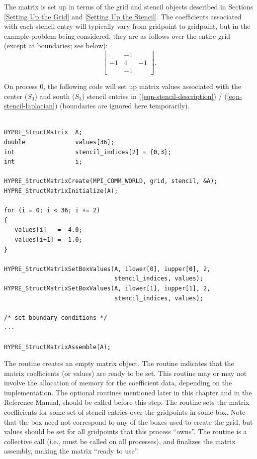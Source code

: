 The matrix is set up in terms of the grid and stencil objects
described in Sections
\ref{Setting Up the Grid} and \ref{Setting Up the Stencil}.
The coefficients associated with each stencil entry will typically
vary from gridpoint to gridpoint, but in the example problem being
considered, they are as follows over the entire grid (except at
boundaries; see below):
\begin{equation}\label{eqn-stencil-laplacian}
\left [
\begin{array}{ccc}
    & -1 &    \\
 -1 &  4 & -1 \\
    & -1 &    
\end{array}
\right ] .
\end{equation}

On process 0, the following code will set up matrix values associated
with the center ($S_0$) and south ($S_3$) stencil entries in
(\ref{eqn-stencil-description}) / (\ref{eqn-stencil-laplacian})
(boundaries are ignored here temporarily).
\begin{display}
\begin{verbatim}

HYPRE_StructMatrix  A;
double              values[36];
int                 stencil_indices[2] = {0,3};
int                 i;

HYPRE_StructMatrixCreate(MPI_COMM_WORLD, grid, stencil, &A);
HYPRE_StructMatrixInitialize(A);

for (i = 0; i < 36; i += 2)
{
   values[i]   =  4.0;
   values[i+1] = -1.0;
}

HYPRE_StructMatrixSetBoxValues(A, ilower[0], iupper[0], 2,
                               stencil_indices, values);
HYPRE_StructMatrixSetBoxValues(A, ilower[1], iupper[1], 2,
                               stencil_indices, values);

/* set boundary conditions */
...

HYPRE_StructMatrixAssemble(A);

\end{verbatim}
\end{display}
The  routine creates an empty matrix object.  The
 routine indicates that the matrix coefficients
(or values) are ready to be set.  This routine may or may not involve
the allocation of memory for the coefficient data, depending on the
implementation.  The optional  routines mentioned later in
this chapter and in the Reference Manual, should be called before this
step.  The  routine sets the matrix coefficients
for some set of stencil entries over the gridpoints in some box.  Note
that the box need not correspond to any of the boxes used to create
the grid, but values should be set for all gridpoints that this
process ``owns''.  The  routine is a collective call
(i.e., must be called on all processes), and finalizes the matrix
assembly, making the matrix ``ready to use''.

